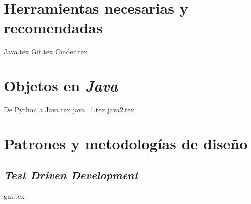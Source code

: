 \documentclass[12pt]{book}
\begin{document}
  \frontmatter
  \maketitle
  \tableofcontents
  

  \mainmatter
  \part{Herramientas necesarias y recomendadas}
    {Java.tex}
    {Git.tex}
    {Cmder.tex}
  \part{Objetos en \textit{Java}}
    
    {De Python a Java.tex}
    {java_1.tex}
    {java2.tex}
  \part{Patrones y metodologías de diseño}
    \chapter{\textit{Test Driven Development}}
      \label{ch:tdd}
    {gui.tex}
\end{document}
